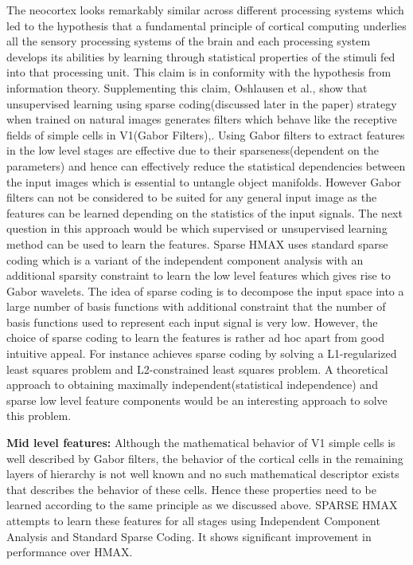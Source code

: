 \documentclass[12pt,twoside]{article}
\theoremstyle{plain}
\theoremstyle{definition}
\theoremstyle{remark}
\begin{document}
The neocortex looks remarkably similar across different processing systems which led to the hypothesis that a fundamental principle of cortical computing underlies all the sensory processing systems\cite{VB1997} of the brain and each processing system develops its abilities by learning through statistical properties of the stimuli fed into that processing unit. This claim is in conformity with the hypothesis from information theory. Supplementing this claim, Oshlausen et al.,\cite{BrunoA.Olshausen1996} show that unsupervised learning using sparse coding(discussed later in the paper) strategy when trained on natural images generates filters which behave like the receptive fields of simple cells in V1(Gabor Filters)\cite{JPJones1987},\cite{Gabor1946}. Using Gabor filters to extract  features in the low level stages are effective due to their sparseness(dependent on the parameters) and hence can effectively reduce the statistical dependencies\cite{BrunoA.Olshausen1996} between the input images which is essential to untangle object manifolds\cite{JamesJ.DiCarlo2007}. However Gabor filters can not be considered to be suited for any general input image as the features can be learned depending on the statistics of the input signals. The next question in this approach would be which supervised or unsupervised learning method can be used to learn the features. Sparse HMAX\citep{XiaolinHu2014} uses standard sparse coding which is a variant of the independent component analysis with an additional sparsity constraint to learn the low level features which gives rise to Gabor wavelets. The idea of sparse coding is to decompose the input space into a large number of basis functions with additional constraint that the number of basis functions used to represent each input signal is very low. However, the choice of sparse coding to learn the features is rather ad hoc apart from good intuitive appeal. For instance \cite{HonglakLee2006} achieves sparse coding by solving a L1-regularized least squares problem and L2-constrained least
squares problem. A theoretical approach to obtaining maximally independent(statistical independence) and sparse low level feature components would be an interesting approach to solve this problem. 

\textbf{Mid level features: }
Although the mathematical behavior of V1 simple cells is well described by Gabor filters, the behavior of the cortical cells in the remaining layers of hierarchy is not well known and no such mathematical descriptor exists that describes the behavior of these cells. Hence these properties need to be learned according to the same principle as we discussed above. SPARSE HMAX\cite{XiaolinHu2014} attempts to learn these features for all stages using Independent Component Analysis and Standard Sparse Coding\cite{XiaolinHu2014}. It shows significant improvement in performance over HMAX\cite{MaximilianRiesenhuber1999}. 
\end{document}
